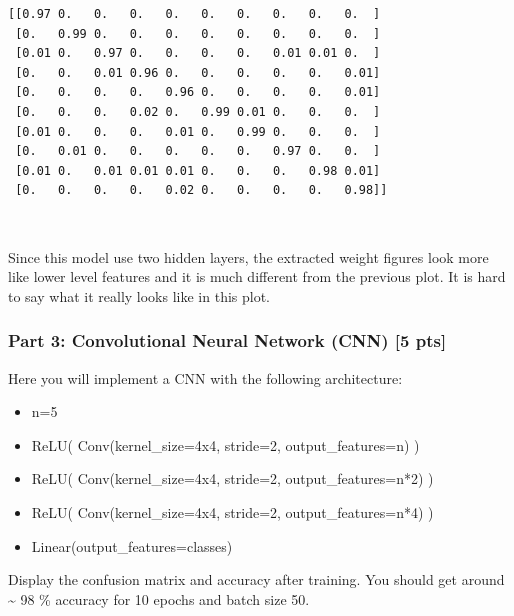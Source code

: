 \documentclass[11pt]{article}
\providecommand{\tightlist}{%
      \setlength{\itemsep}{0pt}\setlength{\parskip}{0pt}}
\begin{document}
    \begin{Verbatim}[commandchars=\\\{\}]
[[0.97 0.   0.   0.   0.   0.   0.   0.   0.   0.  ]
 [0.   0.99 0.   0.   0.   0.   0.   0.   0.   0.  ]
 [0.01 0.   0.97 0.   0.   0.   0.   0.01 0.01 0.  ]
 [0.   0.   0.01 0.96 0.   0.   0.   0.   0.   0.01]
 [0.   0.   0.   0.   0.96 0.   0.   0.   0.   0.01]
 [0.   0.   0.   0.02 0.   0.99 0.01 0.   0.   0.  ]
 [0.01 0.   0.   0.   0.01 0.   0.99 0.   0.   0.  ]
 [0.   0.01 0.   0.   0.   0.   0.   0.97 0.   0.  ]
 [0.01 0.   0.01 0.01 0.01 0.   0.   0.   0.98 0.01]
 [0.   0.   0.   0.   0.02 0.   0.   0.   0.   0.98]]

    \end{Verbatim}

    \begin{center}
    \end{center}
    { \hspace*{\fill} \\}
    
    Since this model use two hidden layers, the extracted weight figures
look more like lower level features and it is much different from the
previous plot. It is hard to say what it really looks like in this plot.

    \hypertarget{part-3-convolutional-neural-network-cnn-5-pts}{%
\subsubsection{Part 3: Convolutional Neural Network (CNN) {[}5
pts{]}}\label{part-3-convolutional-neural-network-cnn-5-pts}}

Here you will implement a CNN with the following architecture:

\begin{itemize}
\tightlist
\item
  n=5
\item
  ReLU( Conv(kernel\_size=4x4, stride=2, output\_features=n) )
\item
  ReLU( Conv(kernel\_size=4x4, stride=2, output\_features=n*2) )
\item
  ReLU( Conv(kernel\_size=4x4, stride=2, output\_features=n*4) )
\item
  Linear(output\_features=classes)
\end{itemize}

Display the confusion matrix and accuracy after training. You should get
around \textasciitilde{} 98 \% accuracy for 10 epochs and batch size 50.
\end{document}
